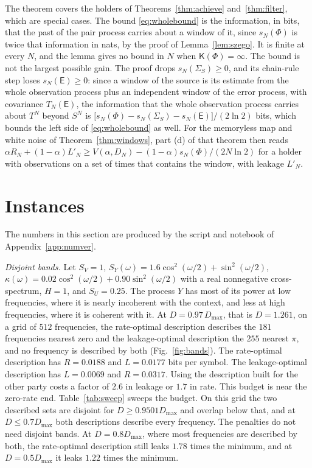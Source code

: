 \documentclass[11pt,onecolumn]{IEEEtran}
\begin{document}
The theorem covers the holders of Theorems~\ref{thm:achieve}
and~\ref{thm:filter}, which are special cases. The bound
\eqref{eq:wholebound} is the information, in bits, that the past of
the pair process carries about a window of it, since
$s_N(\Phi)$ is twice that information in nats, by the proof of
Lemma~\ref{lem:szego}. It is finite at every $N$, and the lemma gives
no bound in $N$ when $\mathsf K(\Phi)=\infty$. The bound is not the
largest possible gain. The proof drops $s_N(\Sigma_S)\ge0$, and its
chain-rule step loses $s_N(\mathsf E)\ge0$: since a window of the
source is its estimate from the whole observation process plus an
independent window of the error process, with covariance
$T_N(\mathsf E)$, the information that the whole observation process
carries about $T^N$ beyond $S^N$ is
$\bigl[s_N(\Phi)-s_N(\Sigma_S)-s_N(\mathsf E)\bigr]/(2\ln2)$ bits, which
bounds the left side of \eqref{eq:wholebound} as well. For the
memoryless map and white noise of Theorem~\ref{thm:windows}, part (d)
of that theorem then reads
$\alpha R_N+(1-\alpha)L'_N\ge V(\alpha,D_N)-(1-\alpha)s_N(\Phi)/(2N\ln2)$
for a holder with observations on a set of times that contains the
window, with leakage $L'_N$.

\section{Instances}
\label{sec:examples}

The numbers in this section are produced by the script and notebook of
Appendix~\ref{app:numver}.

\emph{Disjoint bands.} Let $S_V=1$,
$S_Y(\omega)=1.6\cos^2(\omega/2)+\sin^2(\omega/2)$,
$\kappa(\omega)=0.02\cos^2(\omega/2)+0.90\sin^2(\omega/2)$ with a real
nonnegative cross-spectrum, $H=1$, and $S_U=0.25$. The process $Y$ has
most of its power at low frequencies, where it is nearly incoherent
with the context, and less at high frequencies, where it is coherent
with it. At $D=0.97\,D_{\max}$, that is $D=1.261$, on a grid of $512$ frequencies, the
rate-optimal description describes the $181$ frequencies nearest zero
and the leakage-optimal description the $255$ nearest $\pi$, and no
frequency is described by both (Fig.~\ref{fig:bands}). The rate-optimal description
has $R=0.0188$ and $L=0.0177$ bits per symbol. The leakage-optimal
description has $L=0.0069$ and $R=0.0317$. Using the description built
for the other party costs a factor of $2.6$ in leakage or $1.7$ in rate.
This budget is near the zero-rate end. Table~\ref{tab:sweep} sweeps the
budget. On this grid the two described sets are disjoint for
$D\ge0.9501D_{\max}$ and overlap below that, and at $D\le0.7D_{\max}$ both
descriptions describe every frequency. The penalties do not need
disjoint bands. At $D=0.8D_{\max}$, where most frequencies are described
by both, the rate-optimal description still leaks $1.78$ times the
minimum, and at $D=0.5D_{\max}$ it leaks $1.22$ times the minimum.
\end{document}
